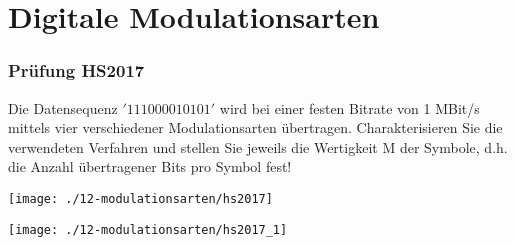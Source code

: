 

\section{Digitale Modulationsarten}

\subsubsection{Prüfung HS2017}
Die Datensequenz $'1 1 1 0 0 0 0 1 0 1 0 1'$ wird bei einer festen Bitrate von 1 MBit/s mittels vier verschiedener Modulationsarten übertragen. Charakterisieren Sie die verwendeten Verfahren und stellen Sie jeweils die Wertigkeit M der Symbole, d.h. die Anzahl übertragener
Bits pro Symbol fest!
\begin{center}
    \vspace{-8pt}
    \texttt{[image: ./12-modulationsarten/hs2017]}
    \vspace{-8pt}
\end{center}
\begin{center}
    \vspace{-8pt}
    \texttt{[image: ./12-modulationsarten/hs2017\_1]}
    \vspace{-8pt}
\end{center}